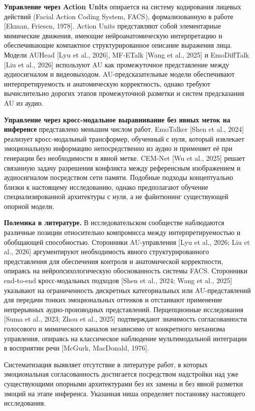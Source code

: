 \documentclass[a4paper, 12pt, oneside, openany]{article}
\begin{document}
\textbf{Управление через Action Units} опирается на систему кодирования лицевых действий (Facial Action Coding System, FACS), формализованную в работе [Ekman, Friesen, 1978]. Action Units представляют собой элементарные мимические движения, имеющие нейроанатомическую интерпретацию и обеспечивающие компактное структурированное описание выражения лица. Модели AUHead [Lyu et al., 2026], MF-ETalk [Wang et al., 2025] и EmoDiffTalk [Liu et al., 2026] используют AU как промежуточное представление между аудиосигналом и видеовыходом. AU-предсказательные модели обеспечивают интерпретируемость и анатомическую корректность, однако требуют вычислительно дорогих этапов промежуточной разметки и систем предсказания AU из аудио.

\textbf{Управление через кросс-модальное выравнивание без явных меток на инференсе} представлено меньшим числом работ. EmoTalker [Shen et al., 2024] реализует кросс-модальный трансформер, обученный с нуля, который извлекает эмоциональную информацию непосредственно из аудио и применяет её при генерации без необходимости в явной метке. CEM-Net [Wu et al., 2025] решает связанную задачу разрешения конфликта между референсным изображением и аудиосигналом посредством сети памяти. Подобные подходы концептуально близки к настоящему исследованию, однако предполагают обучение специализированной архитектуры с нуля, а не файнтюнинг существующей опорной модели.

\textbf{Полемика в литературе.} В исследовательском сообществе наблюдаются различные позиции относительно компромисса между интерпретируемостью и обобщающей способностью. Сторонники AU-управления [Lyu et al., 2026; Liu et al., 2026] аргументируют необходимость явного структурированного представления для обеспечения контроля и анатомической корректности, опираясь на нейропсихологическую обоснованность системы FACS. Сторонники end-to-end кросс-модальных подходов [Shen et al., 2024; Wang et al., 2025] указывают на ограниченность дискретных категориальных или AU-представлений для передачи тонких эмоциональных оттенков и отстаивают применение непрерывных аудио-производных представлений. Перцепционные исследования [Suma et al., 2023; Zhou et al., 2025] подтверждают значимость согласованности голосового и мимического каналов независимо от конкретного механизма управления, опираясь на классическое наблюдение мультимодальной интеграции в восприятии речи [McGurk, MacDonald, 1976].

Систематизация выявляет отсутствие в литературе работ, в которых эмоциональная согласованность достигается посредством надстройки над уже существующими опорными архитектурами без их замены и без явной разметки эмоций на этапе инференса. Указанная ниша определяет постановку настоящего исследования.
\end{document}
